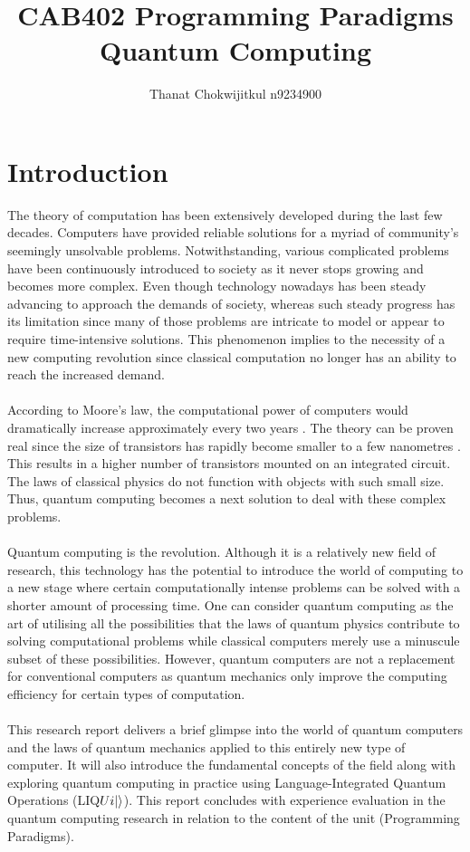 \documentclass[12pt]{third-rep}
\title{CAB402 Programming Paradigms \\ \vspace{2 mm} {Quantum Computing}}
\author{Thanat Chokwijitkul n9234900}
\date{}
\begin{document}
\maketitle %

\tableofcontents
\listoffigures


\chapter{Introduction}

The theory of computation has been extensively developed during the last few decades. Computers have provided reliable solutions for a myriad of community's seemingly unsolvable problems. Notwithstanding, various complicated problems have been continuously introduced to society as it never stops growing and becomes more complex. Even though technology nowadays has been steady advancing to approach the demands of society, whereas such steady progress has its limitation since many of those problems are intricate to model or appear to require time-intensive solutions. This phenomenon implies to the necessity of a new computing revolution since classical computation no longer has an ability to reach the increased demand. \\\\
According to Moore's law, the computational power of computers would dramatically increase approximately every two years \cite{moore}. The theory can be proven real since the size of transistors has rapidly become smaller to a few nanometres \cite{qc-info}. This results in a higher number of transistors mounted on an integrated circuit. The laws of classical physics do not function with objects with such small size. Thus, quantum computing becomes a next solution to deal with these complex problems. \\\\
Quantum computing is the revolution. Although it is a relatively new field of research, this technology has the potential to introduce the world of computing to a new stage where certain computationally intense problems can be solved with a shorter amount of processing time. One can consider quantum computing as the art of utilising all the possibilities that the laws of quantum physics contribute to solving computational problems while classical computers merely use a minuscule subset of these possibilities. However, quantum computers are not a replacement for conventional computers as quantum mechanics only improve the computing efficiency for certain types of computation. \\\\
This research report delivers a brief glimpse into the world of quantum computers and the laws of quantum mechanics applied to this entirely new type of computer. It will also introduce the fundamental concepts of the field along with exploring quantum computing in practice using Language-Integrated Quantum Operations (LIQ$Ui{\left\vert{}\right\rangle}$). This report concludes with experience evaluation in the quantum computing research in relation to the content of the unit (Programming Paradigms).
\end{document}
